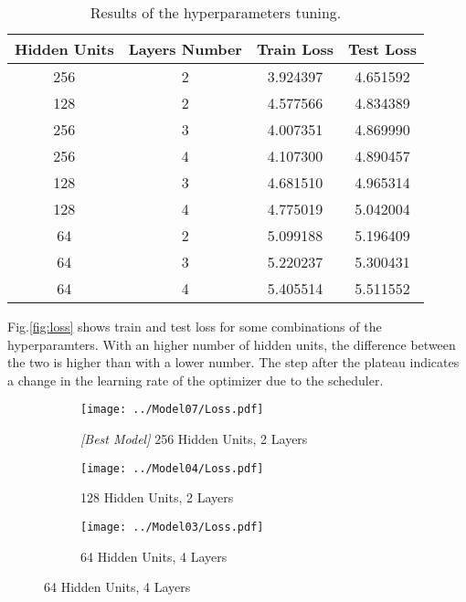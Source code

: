 \documentclass[a4paper,11pt]{article}
\begin{document}
\begin{table}[h]
  \centering
  \caption{Results of the hyperparameters tuning.}
  \label{tab:GridSearch}
  \begin{tabular}{cccc}
    \toprule
    Hidden Units & Layers Number & Train Loss & Test Loss \\
    \midrule
    256 &  2 &  3.924397 &   4.651592 \\
    128 &  2 &  4.577566 &   4.834389 \\
    256 &  3 &  4.007351 &   4.869990 \\
    256 &  4 &  4.107300 &   4.890457 \\
    128 &  3 &  4.681510 &   4.965314 \\
    128 &  4 &  4.775019 &   5.042004 \\
    64  &  2 &  5.099188 &   5.196409 \\
    64  &  3 &  5.220237 &   5.300431 \\
    64  &  4 &  5.405514 &   5.511552 \\
    \bottomrule
  \end{tabular}
\end{table}

Fig.\ref{fig:loss} shows train and test loss for some combinations of the hyperparamters. With an higher number of hidden units, the difference between the two is higher than with a lower number. The step after the plateau indicates a change in the learning rate of the optimizer due to the scheduler.

\begin{figure}[h]
  \centering
  \caption{Train and test loss for some combinations of the hyperparameters.}
  \label{fig:loss}
  \begin{subfigure}[t]{.45\linewidth}
    \centering
    \texttt{[image: ../Model07/Loss.pdf]}
    \caption{\emph{[Best Model]} 256 Hidden Units, 2 Layers}
  \end{subfigure}
  \begin{subfigure}[t]{.45\linewidth}
    \centering
    \texttt{[image: ../Model04/Loss.pdf]}
    \caption{128 Hidden Units, 2 Layers}
  \end{subfigure}
  \begin{subfigure}[t]{.45\linewidth}
    \centering
    \texttt{[image: ../Model03/Loss.pdf]}
    \caption{64 Hidden Units, 4 Layers}
  \end{subfigure}
\end{figure}
\end{document}

